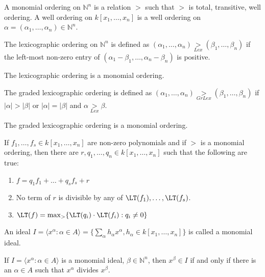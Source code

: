 \documentclass[crop=false,class=book,oneside]{standalone}
\begin{document}
\begin{definition}
A monomial ordering on $\mathbb{N}^n$ is a relation $>$ such that $>$ is total, transitive, well ordering. A well ordering on $k[x_1,\hdots ,x_n]$ is a well ordering on $\alpha = (\alpha_1,\hdots, \alpha_n) \in \mathbb{N}^n$.
\end{definition}
\begin{definition}
The lexicographic ordering on $\mathbb{N}^n$ is defined as $(\alpha_1,\hdots, \alpha_n) \underset{Lex}{>} (\beta_1,\hdots, \beta_n)$ if the left-most non-zero entry of $(\alpha_1-\beta_1,\hdots, \alpha_n-\beta_n)$ is positive.
\end{definition}
\begin{theorem}
The lexicographic ordering is a monomial ordering.
\end{theorem}
\begin{definition}
The graded lexicographic ordering is defined as $(\alpha_1,\hdots, \alpha_n) \underset{GrLex}{>}(\beta_1,\hdots, \beta_n)$ if $|\alpha|>|\beta|$ or $|\alpha| = |\beta|$ and $\alpha \underset{Lex}{>}\beta$.
\end{definition}
\begin{theorem}
The graded lexicographic ordering is a monomial ordering.
\end{theorem}
\begin{theorem}
If $f_1,\hdots, f_s\in k[x_1,\hdots ,x_n]$ are non-zero polynomials and if $>$ is a monomial ordering, then there are $r,q_1,\hdots, q_n\in k[x_1,\hdots ,x_n]$ such that the following are true:
\begin{enumerate}
\item $f=q_1f_1+\hdots + q_sf_s + r$
\item No term of $r$ is divisible by any of $\LT(f_1),\hdots, \LT(f_s)$.
\item $\LT(f) = \max_{>}\{\LT(q_i)\cdot \LT(f_i):q_i \ne 0\}$
\end{enumerate}
\end{theorem}
\begin{definition}
An ideal $I = \langle x^{\alpha}: \alpha \in A\rangle = \{\sum_{\alpha} h_{\alpha} x^\alpha, h_{\alpha} \in k[x_1,\hdots ,x_n]\}$ is called a monomial ideal.
\end{definition}
\begin{theorem}
If $I = \langle x^\alpha: \alpha \in A\rangle$ is a monomial ideal, $\beta \in \mathbb{N}^n$, then $x^\beta \in I$ if and only if there is an $\alpha \in A$ such that $x^\alpha$ divides $x^\beta$.
\end{theorem}
\end{document}
